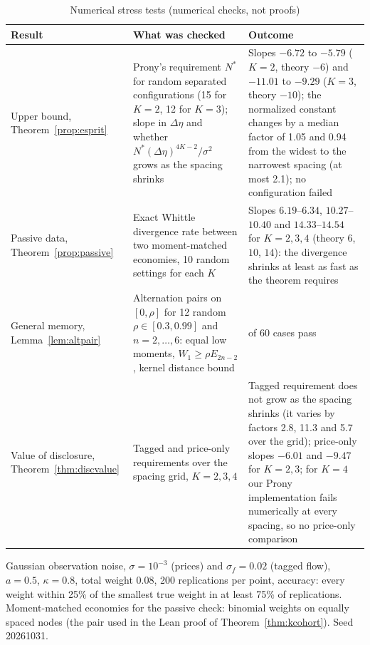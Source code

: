 \documentclass[12pt]{article}
\theoremstyle{definition}
\theoremstyle{remark}
\begin{document}
\begin{table}[!htbp]\centering\footnotesize
\begin{threeparttable}
\caption{Numerical stress tests (numerical checks, not proofs)}\label{tab:stress}
\setlength{\tabcolsep}{3pt}
\begin{tabular}{>{\raggedright\arraybackslash}p{}>{\raggedright\arraybackslash}p{}>{\raggedright\arraybackslash}p{}}
\toprule
Result & What was checked & Outcome\\
\midrule
Upper bound, Theorem~\ref{prop:esprit} & Prony's requirement $N^*$ for random separated configurations (15 for $K=2$, 12 for $K=3$); slope in $\Delta\eta$ and whether $N^*(\Delta\eta)^{4K-2}/\sigma^2$ grows as the spacing shrinks & Slopes $-6.72$ to $-5.79$ ($K=2$, theory $-6$) and $-11.01$ to $-9.29$ ($K=3$, theory $-10$); the normalized constant changes by a median factor of 1.05 and 0.94 from the widest to the narrowest spacing (at most 2.1); no configuration failed\\
Passive data, Theorem~\ref{prop:passive} & Exact Whittle divergence rate between two moment-matched economies, 10 random settings for each $K$ & Slopes $6.19$--$6.34$, $10.27$--$10.40$ and $14.33$--$14.54$ for $K=2,3,4$ (theory $6$, $10$, $14$): the divergence shrinks at least as fast as the theorem requires\\
General memory, Lemma~\ref{lem:altpair} & Alternation pairs on $[0,\rho]$ for 12 random $\rho\in[0.3,0.99]$ and $n=2,\ldots,6$: equal low moments, $W_1\ge\rho E_{2n-2}$, kernel distance bound & 60 of 60 cases pass\\
Value of disclosure, Theorem~\ref{thm:discvalue} & Tagged and price-only requirements over the spacing grid, $K=2,3,4$ & Tagged requirement does not grow as the spacing shrinks (it varies by factors 2.8, 11.3 and 5.7 over the grid); price-only slopes $-6.01$ and $-9.47$ for $K=2,3$; for $K=4$ our Prony implementation fails numerically at every spacing, so no price-only comparison\\
\bottomrule
\end{tabular}
\begin{tablenotes}\footnotesize\item Gaussian observation noise, $\sigma=10^{-3}$ (prices) and $\sigma_f=0.02$ (tagged flow), $a=0.5$, $\kappa=0.8$, total weight $0.08$, 200 replications per point, accuracy: every weight within 25\% of the smallest true weight in at least 75\% of replications. Moment-matched economies for the passive check: binomial weights on equally spaced nodes (the pair used in the Lean proof of Theorem~\ref{thm:kcohort}). Seed 20261031.\end{tablenotes}
\end{threeparttable}
\end{table}
\end{document}
